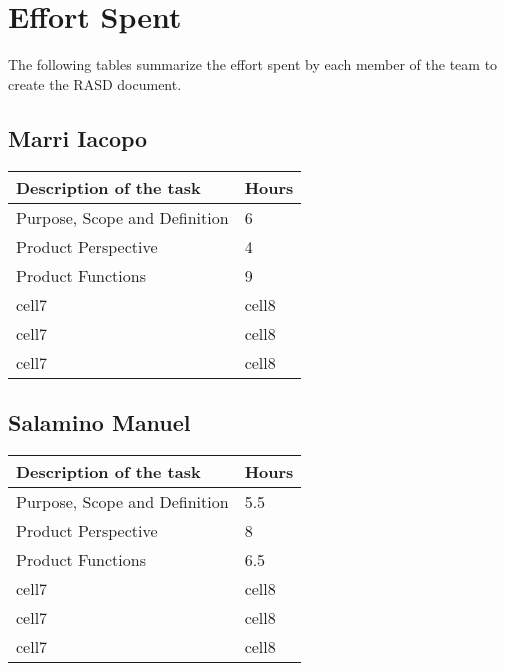 \section{Effort Spent}
The following tables summarize the effort spent by each member of the team to create the RASD document.
\subsection{Marri Iacopo}
\begin{center}
\renewcommand{\arraystretch}{1.5}
\begin{tabular}{ |m{7cm}|m{2cm}| } 
 \hline
 \textbf{Description of the task}  & \textbf{Hours} \\
 \hline
 Purpose, Scope and Definition & 6 \\
 \hline
 Product Perspective & 4 \\ 
 \hline
 Product Functions & 9 \\ 
 \hline 
 cell7 & cell8 \\ 
 \hline
 cell7 & cell8 \\ 
 \hline
 cell7 & cell8 \\ 
 \hline
\end{tabular}
\end{center}


\subsection{Salamino Manuel}
\renewcommand{\arraystretch}{1.5}

\begin{center}
\begin{tabular}{ |m{7cm}|m{2cm}| } 
 \hline
 \textbf{Description of the task}  & \textbf{Hours} \\
 \hline
 Purpose, Scope and Definition & 5.5 \\
 \hline
 Product Perspective & 8 \\ 
 \hline
 Product Functions & 6.5 \\ 
 \hline 
 cell7 & cell8 \\ 
 \hline
 cell7 & cell8 \\ 
 \hline
 cell7 & cell8 \\ 
 \hline
\end{tabular}
\end{center}

